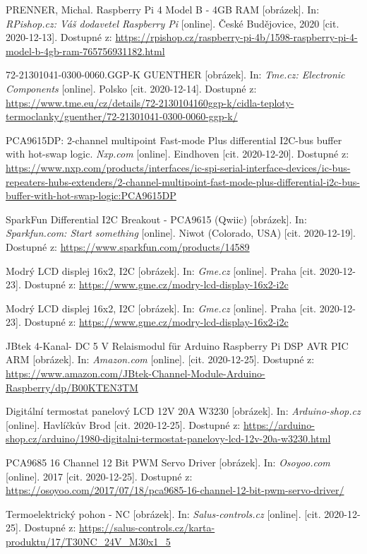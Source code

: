 \begin{thebibliography}{3}
PRENNER, Michal. Raspberry Pi 4 Model B - 4GB RAM [obrázek]. In: \textit{RPishop.cz: Váš dodavetel Raspberry Pi} [online]. České Budějovice, 2020 [cit. 2020-12-13]. Dostupné z: \url{https://rpishop.cz/raspberry-pi-4b/1598-raspberry-pi-4-model-b-4gb-ram-765756931182.html}

72-21301041-0300-0060.GGP-K GUENTHER [obrázek]. In: \textit{Tme.cz: Electronic Components} [online]. Polsko [cit. 2020-12-14]. Dostupné z: \url{https://www.tme.eu/cz/details/72-2130104160ggp-k/cidla-teploty-termoclanky/guenther/72-21301041-0300-0060-ggp-k/}

PCA9615DP: 2-channel multipoint Fast-mode Plus differential I2C-bus buffer with hot-swap logic. \textit{Nxp.com} [online]. Eindhoven [cit. 2020-12-20]. Dostupné z: \url{https://www.nxp.com/products/interfaces/ic-spi-serial-interface-devices/ic-bus-repeaters-hubs-extenders/2-channel-multipoint-fast-mode-plus-differential-i2c-bus-buffer-with-hot-swap-logic:PCA9615DP}

SparkFun Differential I2C Breakout - PCA9615 (Qwiic) [obrázek]. In: \textit{Sparkfun.com: Start something} [online]. Niwot (Colorado, USA) [cit. 2020-12-19]. Dostupné z: \url{https://www.sparkfun.com/products/14589}

Modrý LCD displej 16x2, I2C [obrázek]. In: \textit{Gme.cz} [online]. Praha [cit. 2020-12-23]. Dostupné z: \url{https://www.gme.cz/modry-lcd-display-16x2-i2c}

Modrý LCD displej 16x2, I2C [obrázek]. In: \textit{Gme.cz} [online]. Praha [cit. 2020-12-23]. Dostupné z: \url{https://www.gme.cz/modry-lcd-display-16x2-i2c}

JBtek 4-Kanal- DC 5 V Relaismodul für Arduino Raspberry Pi DSP AVR PIC ARM [obrázek]. In: \textit{Amazon.com} [online]. [cit. 2020-12-25]. Dostupné z: \url{https://www.amazon.com/JBtek-Channel-Module-Arduino-Raspberry/dp/B00KTEN3TM}

Digitální termostat panelový LCD 12V 20A W3230 [obrázek]. In: \textit{Arduino-shop.cz} [online]. Havlíčkův Brod [cit. 2020-12-25]. Dostupné z: \url{https://arduino-shop.cz/arduino/1980-digitalni-termostat-panelovy-lcd-12v-20a-w3230.html}

PCA9685 16 Channel 12 Bit PWM Servo Driver [obrázek]. In: \textit{Osoyoo.com} [online]. 2017 [cit. 2020-12-25]. Dostupné z: \url{https://osoyoo.com/2017/07/18/pca9685-16-channel-12-bit-pwm-servo-driver/}

Termoelektrický pohon - NC [obrázek]. In: \textit{Salus-controls.cz} [online]. [cit. 2020-12-25]. Dostupné z: \url{https://salus-controls.cz/karta-produktu/17/T30NC\_24V\_M30x1\_5}







\end{thebibliography}